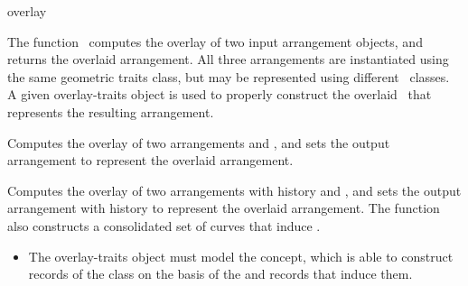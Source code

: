 \ccRefPageBegin

\begin{ccRefFunction}{overlay}

\ccDefinition

The function \ccRefName\ computes the overlay of two input arrangement
objects, and returns the overlaid arrangement. All three arrangements
are instantiated using the same geometric traits class, but may be
represented using different \dcel\ classes. A given overlay-traits object
is used to properly construct the overlaid \dcel\ that represents the
resulting arrangement.



Computes the overlay of two arrangements  and , and sets
the output arrangement  to represent the overlaid arrangement.




Computes the overlay of two arrangements with history  and
, and sets the output arrangement with history  to
represent the overlaid arrangement. The function also constructs a
consolidated set of curves that induce .

\begin{itemize}
\item The overlay-traits object  must model the 
  concept, which is able to construct records of the  class on
  the basis of the  and  records that induce them.
\end{itemize}

\ccSeeAlso

\end{ccRefFunction}

\ccRefPageEnd
